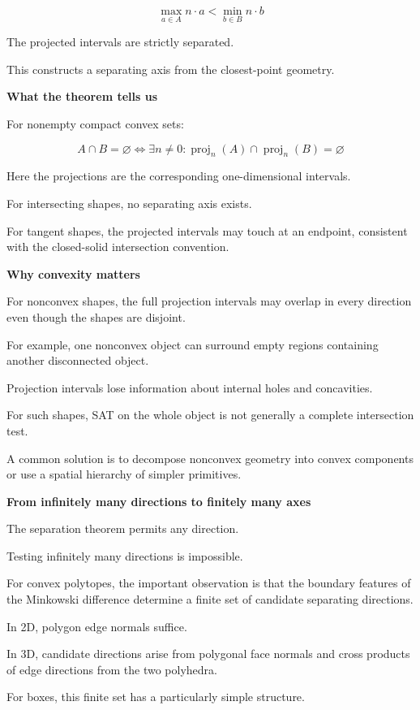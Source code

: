 \[
\boxed{ \max_{a\in A}n\cdot a < \min_{b\in B}n\cdot b }
\]

The projected intervals are strictly separated.

This constructs a separating axis from the closest-point geometry.

\textbf{What the theorem tells us}

For nonempty compact convex sets:

\[
\boxed{ A\cap B=\varnothing \iff \exists n\ne0: \operatorname{proj}_n(A) \cap \operatorname{proj}_n(B)=\varnothing }
\]

Here the projections are the corresponding one-dimensional intervals.

For intersecting shapes, no separating axis exists.

For tangent shapes, the projected intervals may touch at an endpoint, consistent with the closed-solid intersection convention.

\textbf{Why convexity matters}

For nonconvex shapes, the full projection intervals may overlap in every direction even though the shapes are disjoint.

For example, one nonconvex object can surround empty regions containing another disconnected object.

Projection intervals lose information about internal holes and concavities.

For such shapes, SAT on the whole object is not generally a complete intersection test.

A common solution is to decompose nonconvex geometry into convex components or use a spatial hierarchy of simpler primitives.

\textbf{From infinitely many directions to finitely many axes}

The separation theorem permits any direction.

Testing infinitely many directions is impossible.

For convex polytopes, the important observation is that the boundary features of the Minkowski difference determine a finite set of candidate separating directions.

In 2D, polygon edge normals suffice.

In 3D, candidate directions arise from polygonal face normals and cross products of edge directions from the two polyhedra.

For boxes, this finite set has a particularly simple structure.

